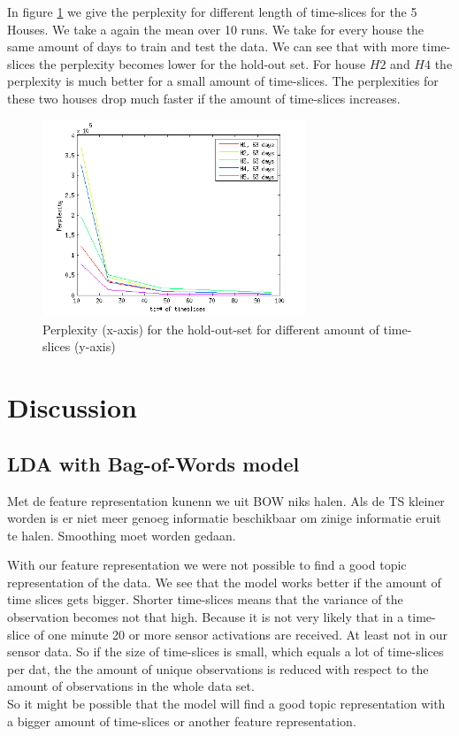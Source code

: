 \documentclass[11pt,a4paper]{article}
\begin{document}
In figure \ref{fig:PerplTS} we give the perplexity for different length of time-slices for the 5 Houses. We take a again the mean over 10 runs. We take for every house the same amount of days to train and test the data. We can see that with more time-slices the perplexity becomes lower for the hold-out set. For house $H2$ and $H4$ the perplexity is much better for a small amount of time-slices. The perplexities for these two houses drop much faster if the amount of time-slices increases.

\begin{figure}[h!]
 \centering
 \includegraphics[width = 0.7\textwidth]{Pictures/PerplTS.png}
 \caption{Perplexity (x-axis) for the hold-out-set for different amount of time-slices (y-axis)}
 \label{fig:PerplTS}
\end{figure}


\pagebreak
 

\section{Discussion}
\label{sec:Disc}

\subsection{LDA with Bag-of-Words model}
Met de feature representation kunenn we uit BOW niks halen. Als de TS kleiner worden is er niet meer genoeg informatie beschikbaar om zinige informatie eruit te halen.
Smoothing moet worden gedaan.

With our feature representation we were not possible to find a good topic representation of the data. We see that the model works better if the amount of time slices gets bigger. Shorter time-slices means that the variance of the observation becomes not that high. Because it is not very likely that in a time-slice of one minute 20 or more sensor activations are received. At least not in our sensor data.  So if the size of time-slices is small, which equals a lot of time-slices per dat, the the amount of unique observations is reduced with respect to the amount of observations in the whole data set.\\
So it might be possible that the model will find a good topic representation with a bigger amount of time-slices or another feature representation.
\end{document}
